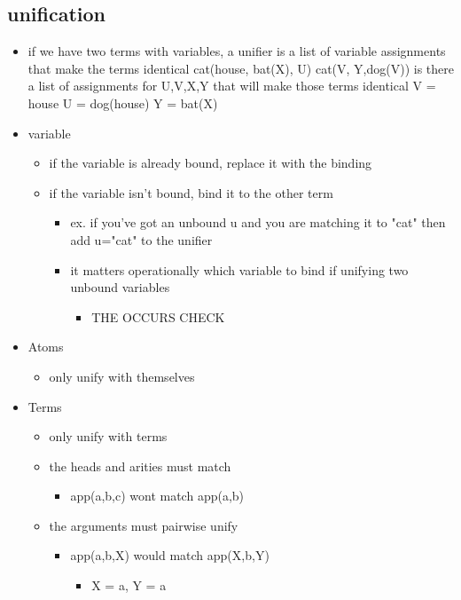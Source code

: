 \documentclass[11pt]{article}
\begin{document}
\subsection{unification}
\label{sec-22-1}
\begin{itemize}
\item if we have two terms with variables, a unifier is a list of variable assignments that make the terms identical
cat(house, bat(X), U)
cat(V, Y,dog(V))
is there a list of assignments for U,V,X,Y that will make those terms identical
V = house
U = dog(house)
Y = bat(X)
\item variable
\begin{itemize}
\item if the variable is already bound, replace it with the binding
\item if the variable isn't bound, bind it to the other term
\begin{itemize}
\item ex. if you've got an unbound u and you are matching it to "cat" then add u="cat" to the unifier
\item it matters operationally which variable to bind if unifying two unbound variables
\begin{itemize}
\item THE OCCURS CHECK
\end{itemize}
\end{itemize}
\end{itemize}
\item Atoms
\begin{itemize}
\item only unify with themselves
\end{itemize}
\item Terms
\begin{itemize}
\item only unify with terms
\item the heads and arities must match
\begin{itemize}
\item app(a,b,c) wont match app(a,b)
\end{itemize}
\item the arguments must pairwise unify
\begin{itemize}
\item app(a,b,X) would match app(X,b,Y)
\begin{itemize}
\item X = a, Y = a
\end{itemize}
\end{itemize}
\end{itemize}
\end{itemize}
\end{document}
